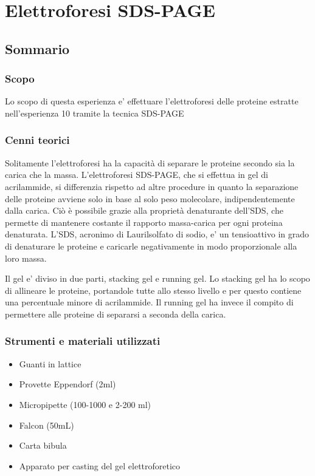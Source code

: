 \section{\LARGE{Elettroforesi SDS-PAGE}}

\vspace{0.6cm}


\subsection{Sommario}

\subsubsection{Scopo}

Lo scopo di questa esperienza e' effettuare
l'elettroforesi
delle proteine estratte nell'esperienza 10 tramite la
tecnica SDS-PAGE

\subsubsection{Cenni teorici}

Solitamente l'elettroforesi ha la capacit\`a di separare le proteine secondo sia
la carica che la massa.
L'elettroforesi SDS-PAGE, che si effettua in gel di acrilammide, si differenzia
rispetto ad altre procedure in quanto la separazione delle proteine
avviene solo in base al solo peso molecolare, indipendentemente dalla carica.
Ci\`o \`e possibile grazie alla propriet\`a denaturante dell'SDS,
che permette di mantenere costante il rapporto massa-carica per ogni proteina denaturata.
L'SDS, acronimo di Laurilsolfato di sodio, e' un tensioattivo in grado di denaturare le proteine e
caricarle negativamente in modo proporzionale alla loro massa.

Il gel e' diviso in due parti, stacking gel e running gel. Lo stacking gel
ha lo scopo di allineare le proteine, portandole tutte allo stesso livello e per
questo contiene una percentuale minore di acrilammide.
Il running gel ha invece il compito di permettere alle proteine di separarsi a
seconda della carica.

\subsubsection{Strumenti e materiali utilizzati}

\begin{itemize}
\item Guanti in lattice
\item Provette Eppendorf (2ml)
\item Micropipette (100-1000 e 2-200 ml)
\item Falcon (50mL)
\item Carta bibula
\item Apparato per casting del gel elettroforetico
\end{itemize}

